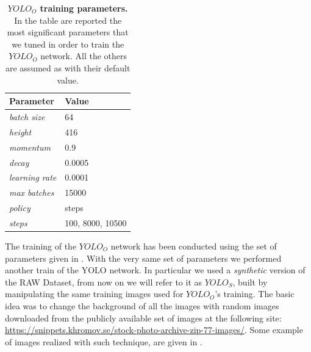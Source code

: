 \begin{table}
	\centering
    \begin{tabular}{| l | l |}
    \hline
    \textbf{Parameter} & \textbf{Value} \\ \hline
    \emph{batch size} & 64 \\
	\emph{height} & 416 \\
	\emph{momentum} & 0.9 \\
	\emph{decay} & 0.0005 \\
	\emph{learning rate} & 0.0001 \\
	\emph{max batches} & 15000 \\
	\emph{policy} & steps \\
	\emph{steps} & 100, 8000, 10500 \\
    \hline
    \end{tabular}
    \caption{\textbf{$YOLO_O$ training parameters.} In the table are reported the most significant parameters that we tuned in order to train the $YOLO_O$ network. All the others are assumed as with their default value.}
    \label{tab:YOLO_standard_training_params}
\end{table}

The training of the $YOLO_O$ network has been conducted using the set of parameters given in . With the very same set of parameters we performed another train of the YOLO network. In particular we used a \emph{synthetic} version of the RAW Dataset, from now on we will refer to it as $YOLO_S$, built by manipulating the same training images used for $YOLO_O$'s training. The basic idea was to change the background of all the images with random images downloaded from the publicly available set of images at the following site: \url{https://snippets.khromov.se/stock-photo-archive-zip-77-images/}. Some example of images realized with such technique, are given in .

